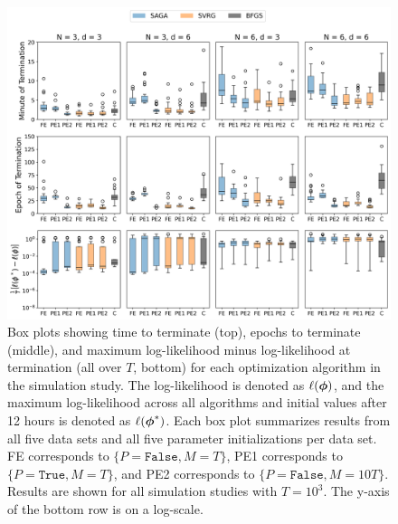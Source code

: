 \documentclass[12pt]{article}
\begin{document}
\begin{figure}[H]
    \centering
    \includegraphics[width=6.5in]{../plt/boxplots_sim_T_1000.png}
    \caption{Box plots showing time to terminate (top), epochs to terminate (middle), and maximum log-likelihood minus log-likelihood at termination (all over $T$, bottom) for each optimization algorithm in the simulation study. The log-likelihood is denoted as $\ell(\boldsymbol{\phi})$, and the maximum log-likelihood across all algorithms and initial values after 12 hours is denoted as $\ell(\boldsymbol{\phi}^*)$. Each box plot summarizes results from all five data sets and all five parameter initializations per data set. FE corresponds to $\{P = \texttt{False}, M = T\}$, PE1 corresponds to $\{P = \texttt{True}, M = T\}$, and PE2 corresponds to $\{P = \texttt{False}, M = 10T\}$. Results are shown for all simulation studies with $T=10^{3}$. The y-axis of the bottom row is on a log-scale.}
    \label{fig:boxplots_sim}
\end{figure}
%
\end{document}
